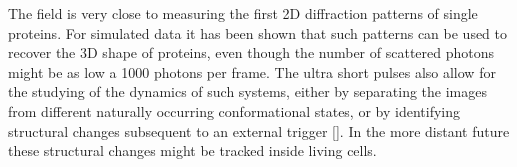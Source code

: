 The field is very close to measuring the first 2D diffraction patterns of single proteins. For simulated data it has been shown that such patterns can be used to recover the 3D shape of proteins, even though the number of scattered photons might be as low a 1000 photons per frame. The ultra short pulses also allow for the studying of the dynamics of such systems, either by separating the images from different naturally occurring conformational states, or by identifying structural changes subsequent to an external trigger []. In the more distant future these structural changes might be tracked inside living cells. 
 